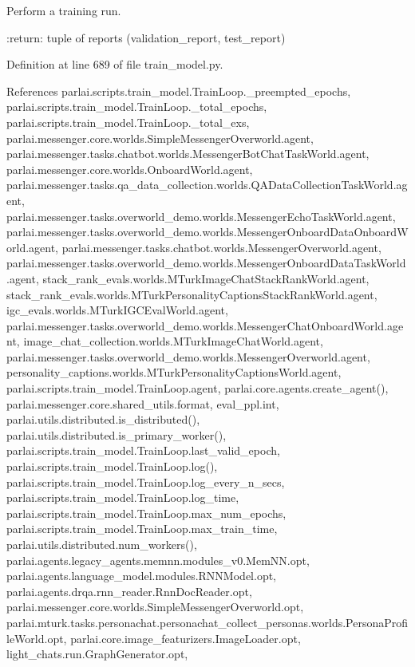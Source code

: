 \begin{DoxyVerb}Perform a training run.

:return: tuple of reports (validation_report, test_report)
\end{DoxyVerb}
 

Definition at line 689 of file train\+\_\+model.\+py.



References parlai.\+scripts.\+train\+\_\+model.\+Train\+Loop.\+\_\+preempted\+\_\+epochs, parlai.\+scripts.\+train\+\_\+model.\+Train\+Loop.\+\_\+total\+\_\+epochs, parlai.\+scripts.\+train\+\_\+model.\+Train\+Loop.\+\_\+total\+\_\+exs, parlai.\+messenger.\+core.\+worlds.\+Simple\+Messenger\+Overworld.\+agent, parlai.\+messenger.\+tasks.\+chatbot.\+worlds.\+Messenger\+Bot\+Chat\+Task\+World.\+agent, parlai.\+messenger.\+core.\+worlds.\+Onboard\+World.\+agent, parlai.\+messenger.\+tasks.\+qa\+\_\+data\+\_\+collection.\+worlds.\+Q\+A\+Data\+Collection\+Task\+World.\+agent, parlai.\+messenger.\+tasks.\+overworld\+\_\+demo.\+worlds.\+Messenger\+Echo\+Task\+World.\+agent, parlai.\+messenger.\+tasks.\+overworld\+\_\+demo.\+worlds.\+Messenger\+Onboard\+Data\+Onboard\+World.\+agent, parlai.\+messenger.\+tasks.\+chatbot.\+worlds.\+Messenger\+Overworld.\+agent, parlai.\+messenger.\+tasks.\+overworld\+\_\+demo.\+worlds.\+Messenger\+Onboard\+Data\+Task\+World.\+agent, stack\+\_\+rank\+\_\+evals.\+worlds.\+M\+Turk\+Image\+Chat\+Stack\+Rank\+World.\+agent, stack\+\_\+rank\+\_\+evals.\+worlds.\+M\+Turk\+Personality\+Captions\+Stack\+Rank\+World.\+agent, igc\+\_\+evals.\+worlds.\+M\+Turk\+I\+G\+C\+Eval\+World.\+agent, parlai.\+messenger.\+tasks.\+overworld\+\_\+demo.\+worlds.\+Messenger\+Chat\+Onboard\+World.\+agent, image\+\_\+chat\+\_\+collection.\+worlds.\+M\+Turk\+Image\+Chat\+World.\+agent, parlai.\+messenger.\+tasks.\+overworld\+\_\+demo.\+worlds.\+Messenger\+Overworld.\+agent, personality\+\_\+captions.\+worlds.\+M\+Turk\+Personality\+Captions\+World.\+agent, parlai.\+scripts.\+train\+\_\+model.\+Train\+Loop.\+agent, parlai.\+core.\+agents.\+create\+\_\+agent(), parlai.\+messenger.\+core.\+shared\+\_\+utils.\+format, eval\+\_\+ppl.\+int, parlai.\+utils.\+distributed.\+is\+\_\+distributed(), parlai.\+utils.\+distributed.\+is\+\_\+primary\+\_\+worker(), parlai.\+scripts.\+train\+\_\+model.\+Train\+Loop.\+last\+\_\+valid\+\_\+epoch, parlai.\+scripts.\+train\+\_\+model.\+Train\+Loop.\+log(), parlai.\+scripts.\+train\+\_\+model.\+Train\+Loop.\+log\+\_\+every\+\_\+n\+\_\+secs, parlai.\+scripts.\+train\+\_\+model.\+Train\+Loop.\+log\+\_\+time, parlai.\+scripts.\+train\+\_\+model.\+Train\+Loop.\+max\+\_\+num\+\_\+epochs, parlai.\+scripts.\+train\+\_\+model.\+Train\+Loop.\+max\+\_\+train\+\_\+time, parlai.\+utils.\+distributed.\+num\+\_\+workers(), parlai.\+agents.\+legacy\+\_\+agents.\+memnn.\+modules\+\_\+v0.\+Mem\+N\+N.\+opt, parlai.\+agents.\+language\+\_\+model.\+modules.\+R\+N\+N\+Model.\+opt, parlai.\+agents.\+drqa.\+rnn\+\_\+reader.\+Rnn\+Doc\+Reader.\+opt, parlai.\+messenger.\+core.\+worlds.\+Simple\+Messenger\+Overworld.\+opt, parlai.\+mturk.\+tasks.\+personachat.\+personachat\+\_\+collect\+\_\+personas.\+worlds.\+Persona\+Profile\+World.\+opt, parlai.\+core.\+image\+\_\+featurizers.\+Image\+Loader.\+opt, light\+\_\+chats.\+run.\+Graph\+Generator.\+opt, 